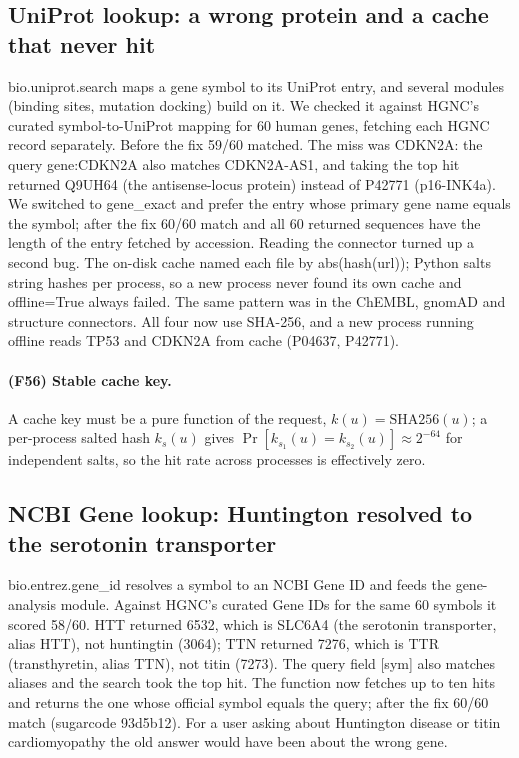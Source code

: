\subsection{UniProt lookup: a wrong protein and a cache that never hit}
bio.uniprot.search maps a gene symbol to its UniProt entry, and several modules (binding sites, mutation docking) build on it. We checked it against HGNC's curated symbol-to-UniProt mapping for 60 human genes, fetching each HGNC record separately. Before the fix 59/60 matched. The miss was CDKN2A: the query gene:CDKN2A also matches CDKN2A-AS1, and taking the top hit returned Q9UH64 (the antisense-locus protein) instead of P42771 (p16-INK4a). We switched to gene\_exact and prefer the entry whose primary gene name equals the symbol; after the fix 60/60 match and all 60 returned sequences have the length of the entry fetched by accession.
Reading the connector turned up a second bug. The on-disk cache named each file by abs(hash(url)); Python salts string hashes per process, so a new process never found its own cache and offline=True always failed. The same pattern was in the ChEMBL, gnomAD and structure connectors. All four now use SHA-256, and a new process running offline reads TP53 and CDKN2A from cache (P04637, P42771).
\paragraph{(F56) Stable cache key.} A cache key must be a pure function of the request, $k(u)=\mathrm{SHA256}(u)$; a per-process salted hash $k_s(u)$ gives $\Pr[k_{s_1}(u)=k_{s_2}(u)]\approx2^{-64}$ for independent salts, so the hit rate across processes is effectively zero.
\subsection{NCBI Gene lookup: Huntington resolved to the serotonin transporter}
bio.entrez.gene\_id resolves a symbol to an NCBI Gene ID and feeds the gene-analysis module. Against HGNC's curated Gene IDs for the same 60 symbols it scored 58/60. HTT returned 6532, which is SLC6A4 (the serotonin transporter, alias HTT), not huntingtin (3064); TTN returned 7276, which is TTR (transthyretin, alias TTN), not titin (7273). The query field [sym] also matches aliases and the search took the top hit. The function now fetches up to ten hits and returns the one whose official symbol equals the query; after the fix 60/60 match (sugarcode 93d5b12). For a user asking about Huntington disease or titin cardiomyopathy the old answer would have been about the wrong gene.

